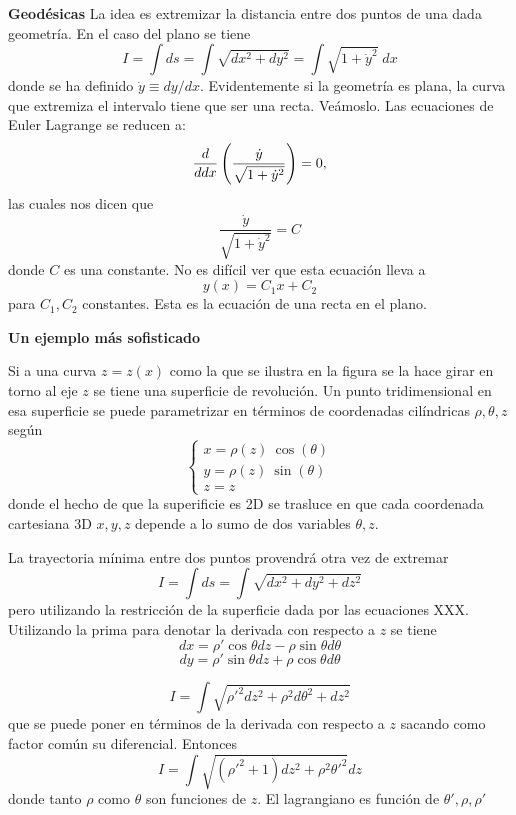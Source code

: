 \documentclass[10pt,oneside]{CBFT_book}
\begin{document}
\begin{ejemplo}{\bf Geodésicas}
La idea es extremizar la distancia entre dos puntos de una dada geometría.
En el caso del plano se tiene 
\[
	I = \int ds = \int \sqrt{ dx^2 + dy^2 } = \int \sqrt{ 1 + \dot{y}^2 } \; dx
\]
donde se ha definido $\dot{y} \equiv dy/dx$. Evidentemente si la geometría es plana,
la curva que extremiza el intervalo tiene que ser una recta. Veámoslo.
Las ecuaciones de Euler Lagrange se reducen a:
\[
	\frac{d^{\hspace{-0.05em}} {}}{d {dx}^{\hspace{-0.05em}}}\left( \frac{\dot{y}}{\sqrt{1 + \dot{y}^2 }}\right) = 0,
\]
las cuales nos dicen que 
\[
	\frac{\dot{y}}{\sqrt{1 + \dot{y}^2 }} = C
\]
donde $C$ es una constante. No es difícil ver que esta ecuación lleva a 
\[
	y(x) = C_1 x + C_2
\]
para $C_1, C_2$ constantes. Esta es la ecuación de una recta en el plano.


{\bf Un ejemplo más sofisticado}

Si a una curva $z=z(x)$ como la que se ilustra en la figura se la hace girar en torno al
eje $z$ se tiene una superficie de revolución. Un punto tridimensional en esa superficie
se puede parametrizar en términos de coordenadas cilíndricas $\rho,\theta, z$ según
\[
	\begin{cases}
	x = \rho(z) \: \cos( \theta ) \\ 
	y = \rho(z) \: \sin( \theta ) \\
	z = z
	\end{cases}
\]
donde el hecho de que la superificie es 2D se trasluce en que cada coordenada cartesiana
3D $x,y,z$ depende a lo sumo de dos variables $\theta,z$.

La trayectoria mínima entre dos puntos provendrá otra vez de extremar
\[
	I = \int ds = \int \sqrt{ dx^2 + dy^2 + dz^2 }
\]
pero utilizando la restricción de la superficie dada por las ecuaciones XXX. Utilizando
la prima para denotar la derivada con respecto a $z$ se tiene 
\[
	dx = \rho' \cos \theta dz - \rho \sin \theta d\theta
\]
\[
	dy = \rho' \sin \theta dz + \rho \cos \theta d\theta
\]

\[
	I = \int \sqrt{ {\rho'}^2 dz^2 + \rho^2 d\theta^2 + dz^2 }
\]
que se puede poner en términos de la derivada con respecto a $z$ sacando como factor común
su diferencial. Entonces
\[
	I = \int \sqrt{ ( {\rho'}^2 + 1 ) dz^2 + \rho^2 {\theta'}^2 } dz
\]
donde tanto $\rho$ como $\theta$ son funciones de $z$.
El lagrangiano es función de $\theta', \rho, \rho'$


\end{ejemplo}
\end{document}
